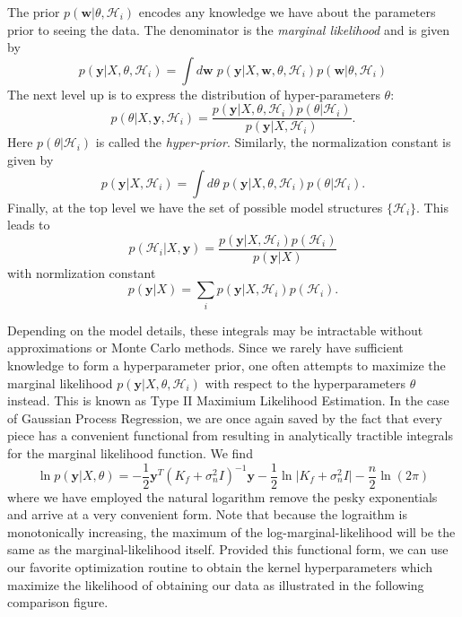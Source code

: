 The prior $p(\mathbf{w}\vert \theta, \mathcal{H}_i)$ encodes any knowledge we have about the parameters prior to seeing the data. The denominator is the \textit{marginal likelihood} and is given by
\begin{equation}
    p(\mathbf{y}\vert X, \theta, \mathcal{H}_i) = \int d\mathbf{w}\; p(\mathbf{y} \vert X, \mathbf{w}, \theta, \mathcal{H}_i)p(\mathbf{w}\vert \theta, \mathcal{H}_i)
\end{equation}
The next level up is to express the distribution of hyper-parameters $\theta$:
\begin{equation}
    p(\theta \vert X, \mathbf{y}, \mathcal{H}_i) = \frac{p(\mathbf{y}\vert X, \theta, \mathcal{H}_i)p(\theta \vert \mathcal{H}_i)}{p(\mathbf{y}\vert X, \mathcal{H}_i)}.
\end{equation}
Here $p(\theta \vert \mathcal{H}_i)$ is called the \textit{hyper-prior}. Similarly, the normalization constant is given by
\begin{equation}
    p(\mathbf{y}\vert X,\mathcal{H}_i) = \int d\theta \; p(\mathbf{y}\vert X, \theta, \mathcal{H}_i)p(\theta \vert \mathcal{H}_i).
\end{equation}
Finally, at the top level we have the set of possible model structures $\{\mathcal{H}_i\}$. This leads to
\begin{equation}
    p(\mathcal{H}_i \vert X, \mathbf{y}) = \frac{p(\mathbf{y} \vert X, \mathcal{H}_i)p(\mathcal{H}_i)}{p(\mathbf{y}\vert X)}
\end{equation}
with normlization constant
\begin{equation}
 p(\mathbf{y}\vert X) = \sum_i p(\mathbf{y} \vert X, \mathcal{H}_i)p(\mathcal{H}_i).
\end{equation}

Depending on the model details, these integrals may be intractable without approximations or Monte Carlo methods. Since we rarely have sufficient knowledge to form a hyperparameter prior, one often attempts to maximize the marginal likelihood $p(\mathbf{y} \vert X, \theta, \mathcal{H}_i)$ with respect to the hyperparameters $\theta$ instead. This is known as Type II Maximium Likelihood Estimation. In the case of Gaussian Process Regression, we are once again saved by the fact that every piece has a convenient functional from resulting in analytically tractible integrals for the marginal likelihood function. We find
\begin{equation}
    \ln p(\mathbf{y}\vert X, \theta) = -\frac{1}{2}\mathbf{y}^T(K_f + \sigma_n^2 I)^{-1}\mathbf{y} - \frac{1}{2}\ln\lvert K_f + \sigma_n^2 I \rvert -\frac{n}{2}\ln(2\pi)
\end{equation}
where we have employed the natural logarithm remove the pesky exponentials and arrive at a very convenient form. Note that because the lograithm is monotonically increasing, the maximum of the log-marginal-likelihood will be the same as the marginal-likelihood itself. Provided this functional form, we can use our favorite optimization routine to obtain the kernel hyperparameters which maximize the likelihood of obtaining our data as illustrated in the following comparison figure.

